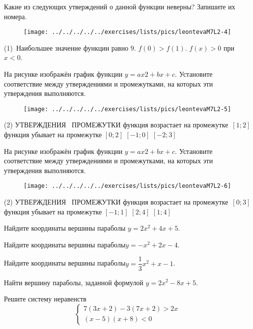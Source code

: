 \begin{class}[number=2]
\begin{listofex}
	Какие из следующих утверждений о данной функции неверны? Запишите их номера.
	\begin{figure}[h!]
		\centering
		\texttt{[image: ../../../../../exercises/lists/pics/leontevaM7L2-4]}
	\end{figure}
	\begin{tasks}(1)
		\task  Наибольшее значение функции равно \( 9 \).
		\task \( f(0)>f(1) \).
		\task \( f( x )>0 \) при \( x<0 \).
	\end{tasks}
	\newpage
	\item На рисунке изображён график функции \(  y = ax2 + bx + c \). Установите соответствие между утверждениями и промежутками, на которых эти утверждения выполняются. 
	\begin{figure}[h!]
		\centering
		\texttt{[image: ../../../../../exercises/lists/pics/leontevaM7L2-5]}
	\end{figure}
	\begin{tasks}(2)
		\task[] УТВЕРЖДЕНИЯ	 
		\task[]	ПРОМЕЖУТКИ
		\task[A)] функция возрастает на промежутке
		\task \( [1;2] \)
		\task[B)]функция убывает на промежутке
		\task \( [0;2] \)
		\task[]
		\task\( [-1;0] \)
		\task[]
		\task\( [-2;3] \)
	\end{tasks}
	\item 
	На рисунке изображён график функции \(  y = ax2 + bx + c \). Установите соответствие между утверждениями и промежутками, на которых эти утверждения выполняются. 
	\begin{figure}[h!]
		\centering
		\texttt{[image: ../../../../../exercises/lists/pics/leontevaM7L2-6]}
	\end{figure}
	\begin{tasks}(2)
		\task[] УТВЕРЖДЕНИЯ	 
		\task[]	ПРОМЕЖУТКИ
		\task[A)] функция возрастает на промежутке
		\task \( [0; 3] \)
		\task[B)]функция убывает на промежутке
		\task \( [-1; 1] \)
		\task[]
		\task\( [2; 4] \)
		\task[]
		\task\( [1; 4] \)
	\end{tasks}
	\item Найдите координаты вершины параболы \( y = 2x^{2} + 4x + 5 \).
	\item Найдите координаты вершины параболы\(  y = -x^{2} + 2x - 4 \).
	\item Найдите координаты вершины параболы\(  y = \dfrac{1}{3}x^{2}+x-1 \).
	\item Найти вершину параболы, заданной формулой \( y=2x^{2} - 8x + 5. \)
	\item Решите систему неравенств  
	\begin{equation*}
		\begin{cases}
			7(3x+2)-3(7x+2)>2x
			\\
			(x-5)(x+8)<0
		\end{cases}
	\end{equation*}
	\end{listofex}
	
\end{class}

